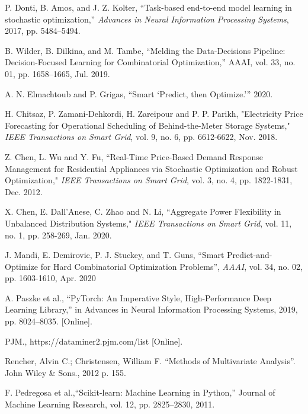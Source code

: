 \documentclass[journal]{IEEEtran}
\begin{document}
\ifCLASSOPTIONcaptionsoff
  \newpage
\fi



\begin{thebibliography}{2}

P. Donti, B. Amos, and J. Z. Kolter, “Task-based end-to-end model learning in stochastic optimization,” \emph{Advances in Neural Information Processing Systems}, 2017, pp. 5484–5494.

B. Wilder, B. Dilkina, and M. Tambe, “Melding the Data-Decisions Pipeline: Decision-Focused Learning for Combinatorial Optimization,” AAAI, vol. 33, no. 01, pp. 1658–1665, Jul. 2019.

A. N. Elmachtoub and P. Grigas, “Smart ‘Predict, then Optimize.’” 2020.

H. Chitsaz, P. Zamani-Dehkordi, H. Zareipour and P. P. Parikh, "Electricity Price Forecasting for Operational Scheduling of Behind-the-Meter Storage Systems," \emph{IEEE Transactions on Smart Grid}, vol. 9, no. 6, pp. 6612-6622, Nov. 2018.

Z. Chen, L. Wu and Y. Fu, “Real-Time Price-Based Demand Response Management for Residential Appliances via Stochastic Optimization and Robust Optimization," \emph{IEEE Transactions on Smart Grid}, vol. 3, no. 4, pp. 1822-1831, Dec. 2012.

X. Chen, E. Dall’Anese, C. Zhao and N. Li, “Aggregate Power Flexibility in Unbalanced Distribution Systems," \emph{IEEE Transactions on Smart Grid}, vol. 11, no. 1, pp. 258-269, Jan. 2020.

J. Mandi, E. Demirovic, P. J. Stuckey, and T. Guns, “Smart Predict-and-Optimize for Hard Combinatorial Optimization Problems”, \emph{AAAI}, vol. 34, no. 02, pp. 1603-1610, Apr. 2020

A. Paszke et al., “PyTorch: An Imperative Style, High-Performance Deep Learning Library,” in Advances in Neural Information Processing Systems, 2019, pp. 8024–8035. [Online].

PJM., https://dataminer2.pjm.com/list [Online].

Rencher, Alvin C.; Christensen, William F. ``Methods of Multivariate Analysis''. John Wiley \& Sons., 2012 p. 155.

F. Pedregosa et al.,``Scikit-learn: Machine Learning in Python,” Journal of Machine Learning Research, vol. 12, pp. 2825–2830, 2011.



\end{thebibliography}
\end{document}
